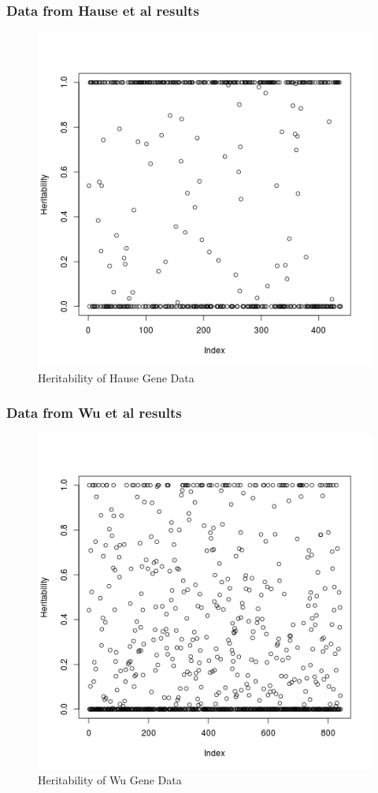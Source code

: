 \documentclass{beamer}
\begin{document}
  \begin{frame}
    \frametitle{Data from Hause et al results}
    \begin{center}
      \begin{figure}
      \includegraphics[scale=0.3]{../Out/reml_hause.png}
      \caption{Heritability of Hause Gene Data}
      \end{figure}
    \end{center}
  \end{frame}
  
  \begin{frame}
    \frametitle{Data from Wu et al results}
    \begin{center}
      \begin{figure}
      \includegraphics[scale=0.3]{../Out/reml_wu.png}
      \caption{Heritability of Wu Gene Data}
      \end{figure}
    \end{center}
  \end{frame}
  
\end{document}
